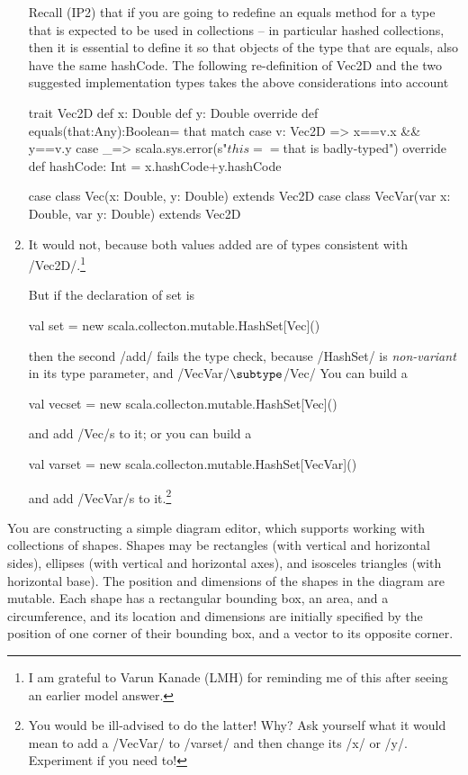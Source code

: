 \documentclass{ip3}
\begin{document}
\begin{foil}
\begin{exercise}
\begin{answer}
\begin{enumerate}
\newpage
Recall (IP2) that if you are going to redefine an equals method for a type that is expected to be
used in collections -- in particular hashed collections, then it is essential to define it so that 
objects of the type that are equals, also have the same hashCode. The following re-definition
of Vec2D and the two suggested implementation types takes the above considerations into account

\begin{-scala}
   trait Vec2D {
     def x: Double
     def y: Double
     override def equals(that:Any):Boolean={
             that match{
                     case v: Vec2D => x==v.x && y==v.y 
                     case _=> scala.sys.error(s"$this == $that is badly-typed")
             }
     }
     override def hashCode: Int = x.hashCode+y.hashCode
   }

   case class Vec(x: Double, y: Double) extends Vec2D 
   case class VecVar(var x: Double, var y: Double) extends Vec2D 
\end{-scala}


\item It would not, because both values added are of types consistent with \sc/Vec2D/.\footnote{I
am grateful to Varun Kanade (LMH) for reminding me of this after seeing an earlier model answer. }

But if the declaration of set is 
\begin{-scala}
val set = new scala.collecton.mutable.HashSet[Vec]()
\end{-scala}
then the second \sc/add/ fails the type check, because \sc/HashSet/
is \textit{non-variant} in its type parameter, and \sc/VecVar/$\subtype$\sc/Vec/ 
You can build a
\begin{-scala}
  val vecset = new scala.collecton.mutable.HashSet[Vec]()
\end{-scala}
and add \sc/Vec/s to it; or you can  build a
\begin{-scala}
  val varset = new scala.collecton.mutable.HashSet[VecVar]()
\end{-scala}
and add \sc/VecVar/s to it.\footnote{You would be ill-advised to
do the latter! Why? Ask yourself what it would mean to add a \sc/VecVar/ to \sc/varset/ and 
then change its \sc/x/ or \sc/y/. Experiment if you need to!}
\end{enumerate}
\end{answer}
\end{exercise}
\begin{exercise}
You are constructing a simple diagram editor, which supports working with
collections of shapes. Shapes may be rectangles (with vertical and
horizontal sides), ellipses (with vertical and horizontal axes), and
isosceles triangles (with horizontal base). The position and dimensions of
the shapes in the diagram are mutable. Each shape has a rectangular
bounding box, an area, and a circumference, and its location and
dimensions are initially specified by the position of one corner
of their bounding box, and a vector to its opposite corner. 





\end{exercise}
\end{foil}
\end{document}
